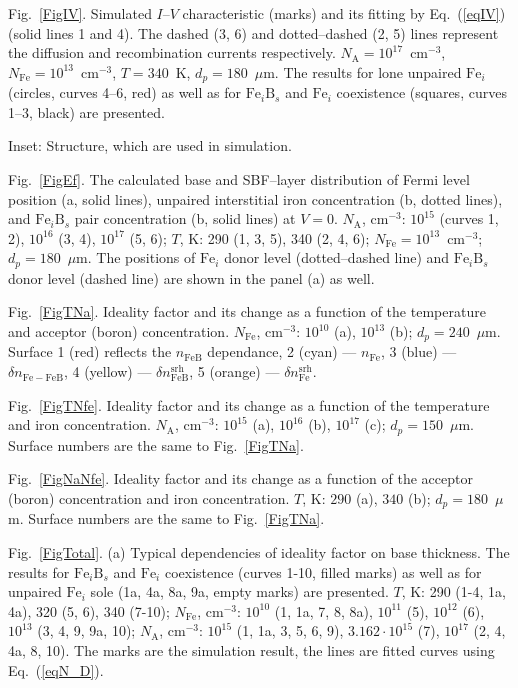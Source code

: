 \documentclass[12pt]{article}
\begin{document}
 Fig.~\ref{FigIV}.
Simulated $I$--$V$ characteristic (marks) and its fitting by Eq.~(\ref{eqIV}) (solid lines 1 and 4).
The dashed (3, 6) and dotted–dashed (2, 5) lines represent the diffusion and recombination currents respectively.
$N_\mathrm{A}=10^{17}$~cm$^{-3}$, $N_\mathrm{Fe}=10^{13}$~cm$^{-3}$, $T=340$~K, $d_p=180$~$\mu$m.
The results for lone unpaired $\mathrm{Fe}_i$ (circles, curves 4--6, red) as well as for $\mathrm{Fe}_i\mathrm{B}_s$ and $\mathrm{Fe}_i$ coexistence
(squares, curves 1--3, black) are presented.

Inset: Structure, which are used in simulation.



 Fig.~\ref{FigEf}.
The calculated base and SBF--layer distribution of Fermi level position (a, solid lines), unpaired interstitial iron concentration (b, dotted lines),
and $\mathrm{Fe}_i\mathrm{B}_s$ pair concentration (b, solid lines) at $V=0$.
$N_\mathrm{A}$, cm$^{-3}$: $10^{15}$ (curves 1, 2), $10^{16}$ (3, 4), $10^{17}$ (5, 6);
$T$, K: 290 (1, 3, 5), 340 (2, 4, 6);
$N_\mathrm{Fe}=10^{13}$~cm$^{-3}$;
$d_p=180$~$\mu$m.
The positions of $\mathrm{Fe}_i$ donor level (dotted--dashed line) and $\mathrm{Fe}_i\mathrm{B}_s$
 donor level (dashed line) are shown in the panel (a) as well.

 Fig.~\ref{FigTNa}.
Ideality factor and its change as a function of the temperature and acceptor (boron) concentration.
$N_\mathrm{Fe}$, cm$^{-3}$: $10^{10}$ (a), $10^{13}$ (b);
$d_p=240$~$\mu$m.
Surface 1 (red) reflects the  $n_\mathrm{FeB}$ dependance,
2 (cyan) ---  $n_\mathrm{Fe}$,
3 (blue) --- $\delta n_\mathrm{Fe-FeB}$,
4 (yellow) --- $\delta n_\mathrm{FeB}^\mathrm{srh}$,
5 (orange) --- $\delta n_\mathrm{Fe}^\mathrm{srh}$.


 Fig.~\ref{FigTNfe}.
Ideality factor and its change as a function of the temperature and iron concentration.
$N_\mathrm{A}$, cm$^{-3}$: $10^{15}$ (a), $10^{16}$ (b), $10^{17}$ (c);
$d_p=150$~$\mu$m.
Surface numbers are the same to Fig.~\ref{FigTNa}.

 Fig.~\ref{FigNaNfe}.
Ideality factor and its change as a function of the acceptor (boron) concentration and iron concentration.
$T$, K: $290$ (a), $340$ (b);
$d_p=180$~$\mu$m.
Surface numbers are the same to Fig.~\ref{FigTNa}.


 Fig.~\ref{FigTotal}.
(a) Typical dependencies of ideality factor on base thickness.
The results for $\mathrm{Fe}_i\mathrm{B}_s$ and $\mathrm{Fe}_i$ coexistence (curves 1-10, filled marks)
as well as for unpaired $\mathrm{Fe}_i$ sole (1a, 4a, 8a, 9a, empty marks) are presented.
$T$, K: 290 (1-4, 1a, 4a), 320 (5, 6), 340 (7-10);
$N_\mathrm{Fe}$, cm$^{-3}$: $10^{10}$ (1, 1a, 7, 8, 8a), $10^{11}$ (5), $10^{12}$ (6), $10^{13}$ (3, 4, 9, 9a, 10);
$N_\mathrm{A}$, cm$^{-3}$: $10^{15}$ (1, 1a, 3, 5, 6, 9), $3.162\cdot10^{15}$ (7),  $10^{17}$ (2, 4, 4a, 8, 10).
The marks are the simulation result,
the lines are fitted curves using Eq.~(\ref{eqN_D}).
\end{document}
